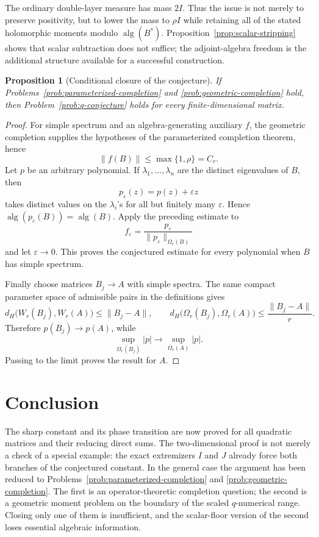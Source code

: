 \documentclass[11pt]{article}
\newtheorem{proposition}[theorem]{Proposition}
\theoremstyle{remark}
\newcommand{\alg}{\operatorname{alg}}
\begin{document}
The ordinary double-layer measure has mass \(2I\).  Thus the issue is
not merely to preserve positivity, but to lower the mass to \(\rho I\)
while retaining all of the stated holomorphic moments modulo
\(\alg(B^*)\).  Proposition~\ref{prop:scalar-stripping} shows that
scalar subtraction does not suffice; the adjoint-algebra freedom is
the additional structure available for a successful construction.

\begin{proposition}[Conditional closure of the conjecture]
\label{prop:conditional-closure}
If Problems~\ref{prob:parameterized-completion} and
\ref{prob:geometric-completion} hold, then
Problem~\ref{prob:q-conjecture} holds for every finite-dimensional
matrix.
\end{proposition}

\begin{proof}
For simple spectrum and an algebra-generating auxiliary \(f\), the geometric
completion supplies the hypotheses of the parameterized completion
theorem, hence
\[
 \|f(B)\|\leq\max\{1,\rho\}=C_r.
\]
Let \(p\) be an arbitrary polynomial.  If
\(\lambda_1,\ldots,\lambda_n\) are the distinct eigenvalues of \(B\),
then
\[
 p_\varepsilon(z)=p(z)+\varepsilon z
\]
takes distinct values on the \(\lambda_i\)'s for all but finitely many
\(\varepsilon\).  Hence
\(\alg(p_\varepsilon(B))=\alg(B)\).  Apply the preceding estimate to
\[
 f_\varepsilon=
 \frac{p_\varepsilon}
 {\|p_\varepsilon\|_{\Omega_r(B)}}
\]
and let \(\varepsilon\to0\).  This proves the conjectured estimate for
every polynomial when \(B\) has simple spectrum.

Finally choose matrices \(B_j\to A\) with simple spectra.  The same
compact parameter space of admissible pairs in the definitions gives
\[
 d_H\bigl(W_r(B_j),W_r(A)\bigr)\leq\|B_j-A\|,
\qquad
 d_H\bigl(\Omega_r(B_j),\Omega_r(A)\bigr)
\leq\frac{\|B_j-A\|}{r}.
\]
Therefore \(p(B_j)\to p(A)\), while
\[
 \sup_{\Omega_r(B_j)}|p|
 \longrightarrow
 \sup_{\Omega_r(A)}|p|.
\]
Passing to the limit proves the result for \(A\).
\end{proof}

\section{Conclusion}

The sharp constant and its phase transition are now proved for all
quadratic matrices and their reducing direct sums.  The
two-dimensional proof is not merely a check of a special example:
the exact extremizers \(I\) and \(J\) already force both branches of
the conjectured constant.  In the general case the argument has been
reduced to Problems~\ref{prob:parameterized-completion} and
\ref{prob:geometric-completion}.  The first is an operator-theoretic
completion question; the second is a geometric moment problem on the
boundary of the scaled \(q\)-numerical range.  Closing only one of
them is insufficient, and the scalar-floor version of the second
loses essential algebraic information.
\end{document}
